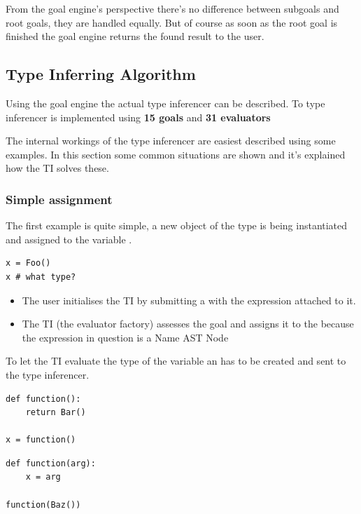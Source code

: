 \documentclass[12pt,halfparskip,DIV11,BCOR10mm]{scrreprt}
\begin{document}
From the goal engine's perspective there's no difference between subgoals and root goals, they are handled equally. But of course as soon as the root goal is finished the goal engine returns the found result to the user.

\subsection{Type Inferring Algorithm}

Using the goal engine the actual type inferencer can be described. To type inferencer is implemented using \textbf{15 goals} and \textbf{31 evaluators}

The internal workings of the type inferencer are easiest described using some examples. In this section some common situations are shown and it's explained how the TI solves these.

\subsubsection{Simple assignment}

The first example is quite simple, a new object of the type  is being instantiated and assigned to the variable . 

\begin{lstlisting}
x = Foo()
x # what type?
\end{lstlisting}

\begin{itemize}
	\item The user initialises the TI by submitting a  with the expression  attached to it.
	\item The TI (the evaluator factory) assesses the goal and assigns it to the  because the expression in question is a Name AST Node
\end{itemize}
To let the TI evaluate the type of the variable  an  has to be created and sent to the type inferencer.


\begin{lstlisting}
def function():
	return Bar()

x = function()
\end{lstlisting}

\begin{lstlisting}
def function(arg):
	x = arg
	
function(Baz())
\end{lstlisting}
\end{document}
